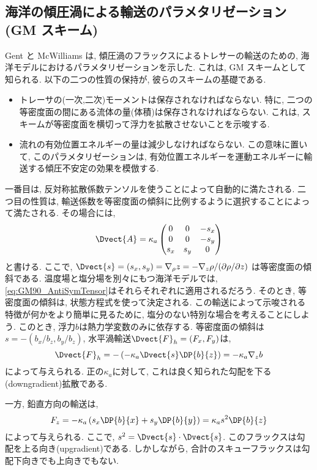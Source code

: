 \subsection{海洋の傾圧渦による輸送のパラメタリゼーション(GM スキーム)}
Gent と McWilliams は, 傾圧渦のフラックスによるトレサーの輸送のための, 
海洋モデルにおけるパラメタリゼーションを示した. 
これは, GM スキームとして知られる. 
以下の二つの性質の保持が, 彼らのスキームの基礎である. 
\begin{itemize}
 \item トレーサの(一次,二次)モーメントは保存されなければならない. 特に, 二つの等密度面の間にある流体の量(体積)は保存されなければならない. これは, スキームが等密度面を横切って浮力を拡散させないことを示唆する. 
 \item 流れの有効位置エネルギーの量は減少しなければならない. この意味に置いて, このパラメタリゼーションは, 有効位置エネルギーを運動エネルギーに輸送する傾圧不安定の効果を模倣する. 
\end{itemize}
一番目は, 反対称拡散係数テンソルを使うことによって自動的に満たされる. 
二つ目の性質は, 輸送係数を等密度面の傾斜に比例するように選択することによって満たされる. 
その場合には, 
\begin{equation}
  \Dvect{A} = \kappa_a
\begin{pmatrix}
 0 &0 &-s_x \\
 0 &0 &-s_y \\
 s_x &s_y &0
\end{pmatrix}
\label{eq:GM90_AntiSymTensor}
\end{equation}
と書ける. 
ここで, $\Dvect{s}=(s_x, s_y)=\nabla_\rho z=- \nabla_z \rho/(\partial \rho/\partial z)$
は等密度面の傾斜である. 
温度場と塩分場を別々にもつ海洋モデルでは, \eqref{eq:GM90_AntiSymTensor}はそれらそれぞれに適用されるだろう. 
そのとき, 等密度面の傾斜は, 状態方程式を使って決定される. 
この輸送によって示唆される特徴が何かをより簡単に見るために, 塩分のない特別な場合を考えることにしよう. 
このとき, 浮力$b$は熱力学変数のみに依存する. 
等密度面の傾斜は$s=-(b_x/b_z, b_y/b_z)$, 水平渦輸送$\Dvect{F}_h=(F_x, F_y)$は, 
\begin{equation}
 \Dvect{F}_h = -\left(-\kappa_a \Dvect{s} \DP{b}{z} \right)
  = - \kappa_a \nabla_z b
  \label{eq:F_skew_horizontal}
\end{equation}
によって与えられる. 
正の$\kappa_a$に対して, これは良く知られた勾配を下る(downgradient)拡散である. 

一方, 鉛直方向の輸送は, 
\begin{equation}
  F_z = - \kappa_a \left(s_x\DP{b}{x} + s_y\DP{b}{y}\right)
      = \kappa_a s^2 \DP{b}{z} 
  \label{eq:F_skew_vertical}
\end{equation}
によって与えられる. 
ここで, $s^2=\Dvect{s}\cdot\Dvect{s}$. 
このフラックスは勾配を上る向き(upgradient)である. 
しかしながら, 合計のスキューフラックスは勾配下向きでも上向きでもない. 

